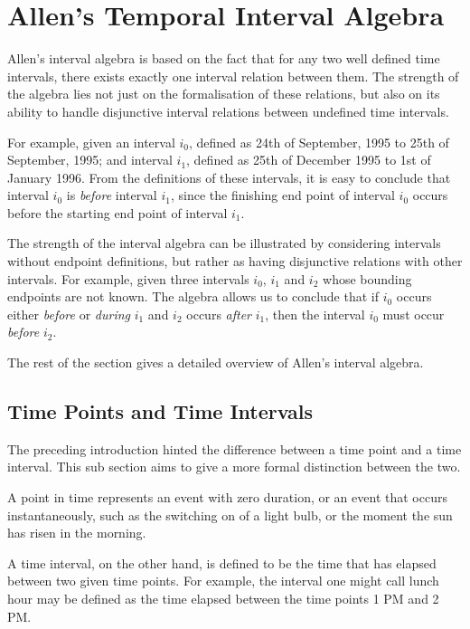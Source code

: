 \documentclass[11pt]{report}
\begin{document}
    \section{Allen's Temporal Interval Algebra}

      Allen's interval algebra \cite{AL} is based on the fact that for any
      two well defined time intervals, there exists exactly one interval
      relation between them. The strength of the algebra lies not just on
      the formalisation of these relations, but also on its ability to handle
      disjunctive interval relations between undefined time intervals.

      For example, given an interval ${i_0}$, defined as 24th of September,
      1995 to 25th of September, 1995; and interval ${i_1}$, defined as 25th of
      December 1995 to 1st of January 1996. From the definitions of these
      intervals, it is easy to conclude that interval ${i_0}$ is {\em before}
      interval ${i_1}$, since the finishing end point of interval ${i_0}$
      occurs before the starting end point of interval ${i_1}$.

      The strength of the interval algebra can be illustrated by considering
      intervals without endpoint definitions, but rather as having disjunctive
      relations with other intervals. For example, given three intervals
      ${i_0}$, ${i_1}$ and ${i_2}$ whose bounding endpoints are not known. The
      algebra allows us to conclude that if ${i_0}$ occurs either {\em before}
      or {\em during} ${i_1}$ and ${i_2}$ occurs {\em after} ${i_1}$, then the
      interval ${i_0}$ must occur {\em before} ${i_2}$.

      The rest of the section gives a detailed overview of Allen's interval
      algebra.

      \subsection{Time Points and Time Intervals}

        The preceding introduction hinted the difference between a time point and a
        time interval. This sub section aims to give a more formal distinction between
        the two.

        A point in time represents an event with zero duration, or an event that occurs
        instantaneously, such as the switching on of a light bulb, or the moment the sun
        has risen in the morning.

        A time interval, on the other hand, is defined to be the time that has elapsed
        between two given time points. For example, the interval one might call lunch
        hour may be defined as the time elapsed between the time points 1 PM and 2 PM.
\end{document}
